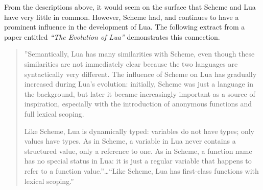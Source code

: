 From the descriptions above, it would seem on the surface that Scheme and Lua
have very little in common. However, Scheme had, and continues to have a
prominent influence in the development of Lua. The following extract from a
paper entitled \emph{``The Evolution of Lua''} demonstrates this connection.

\begin{quotation}
''Semantically, Lua has many similarities with Scheme, even though these
similarities are not immediately clear because the two languages are
syntactically very different. The influence of Scheme on Lua has gradually
increased during Lua’s evolution: initially, Scheme was just a language in the
background, but later it became increasingly important as a source of
inspiration, especially with the introduction of anonymous functions and full
lexical scoping.

Like Scheme, Lua is dynamically typed: variables do not have types; only values
have types. As in Scheme, a variable in Lua never contains a structured value,
only a reference to one. As in Scheme, a function name has no special status in
Lua: it is just a regular variable that happens to refer to a function
value.''\ldots ``Like Scheme, Lua has first-class functions with lexical
scoping.''~\cite[Sec~2]{evolua}
\end{quotation}
